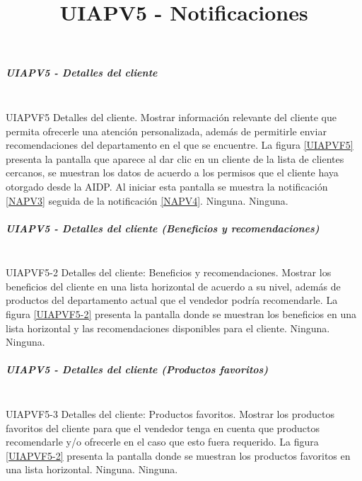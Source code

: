 \subparagraph{UIAPV5 - Detalles del cliente} ~\\

{UIAPVF5} %
{Detalles del cliente.}  %
{Mostrar información relevante del cliente que permita ofrecerle una atención personalizada, además de permitirle enviar recomendaciones del departamento en el que se encuentre.} %
{La figura \ref{UIAPVF5} presenta la pantalla que aparece al dar clic en un cliente de la lista de clientes cercanos, se muestran los datos de acuerdo a los permisos que el cliente haya otorgado desde la AIDP. Al iniciar esta pantalla se muestra la notificación \ref{NAPV3} seguida de la notificación \ref{NAPV4}.} %
{Ninguna.} %
{Ninguna.} %

\subparagraph{UIAPV5 - Detalles del cliente (Beneficios y recomendaciones)} ~\\

{UIAPVF5-2} %
{Detalles del cliente: Beneficios y recomendaciones.}  %
{Mostrar los beneficios del cliente en una lista horizontal de acuerdo a su nivel, además de productos del departamento actual que el vendedor podría recomendarle.} %
{La figura \ref{UIAPVF5-2} presenta la pantalla donde se muestran los beneficios en una lista horizontal y las recomendaciones disponibles para el cliente.} %
{Ninguna.} %
{Ninguna.} %

\subparagraph{UIAPV5 - Detalles del cliente (Productos favoritos)} ~\\

{UIAPVF5-3} %
{Detalles del cliente: Productos favoritos.}  %
{Mostrar los productos favoritos del cliente para que el vendedor tenga en cuenta que productos recomendarle y/o ofrecerle en el caso que esto fuera requerido.} %
{La figura \ref{UIAPVF5-2} presenta la pantalla donde se muestran los productos favoritos en una lista horizontal.} %
{Ninguna.} %
{Ninguna.} %



\title{\textbf{UIAPV5 - Notificaciones}\\}

